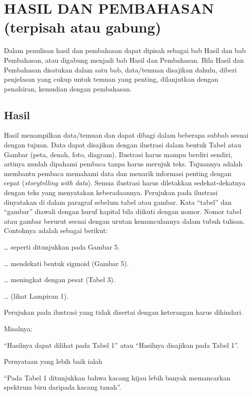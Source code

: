 
\chapter{HASIL DAN PEMBAHASAN (terpisah atau gabung)}

Dalam penulisan hasil dan pembahasan dapat dipisah sebagai bab Hasil dan bab
Pembahasan, atau digabung menjadi bab Hasil dan Pembahasan. Bila Hasil dan
Pembahasan disatukan dalam satu bab, data/temuan disajikan dahulu, diberi
penjelasan yang cukup untuk temuan yang penting, dilanjutkan dengan penafsiran,
kemudian dengan pembahasan.

\section{Hasil}

Hasil menampilkan data/temuan dan dapat dibagi dalam beberapa subbab sesuai
dengan tujuan. Data dapat disajikan dengan ilustrasi dalam bentuk Tabel atau
Gambar (peta, denah, foto, diagram). Ilustrasi harus mampu berdiri sendiri,
artinya mudah dipahami pembaca tanpa harus merujuk teks. Tujuannya adalah
membantu pembaca memahami data dan menarik informasi penting dengan cepat
(\textit{storytelling with data}). Semua ilustrasi harus diletakkan
sedekat-dekatnya dengan teks yang menyatakan keberadaannya. Perujukan pada
ilustrasi dinyatakan di dalam paragraf sebelum tabel atau gambar. Kata
\enquote{tabel} dan \enquote{gambar} diawali dengan huruf kapital bila diikuti
dengan nomor. Nomor tabel atau gambar berurut sesuai dengan urutan kemunculannya
dalam tubuh tulisan. Contohnya adalah sebagai berikut:

\noindent\ldots{} seperti ditunjukkan pada Gambar 5.\par
\noindent\ldots{} mendekati bentuk sigmoid (Gambar 5).\par
\noindent\ldots{} meningkat dengan pesat (Tabel 3).\par
\noindent\ldots{} (lihat Lampiran 1).\par

Perujukan pada ilustrasi yang tidak disertai dengan keterangan harus
dihindari.\par
\noindent Misalnya:\par
\noindent \enquote{Hasilnya dapat dilihat pada Tabel 1} atau
\enquote{Hasilnya disajikan pada Tabel 1}.\par
\noindent Pernyataan yang lebih baik ialah\par
\noindent \enquote{Pada Tabel 1 ditunjukkan bahwa kacang hijau lebih banyak
memancarkan spektrum biru daripada kacang tanah}.

